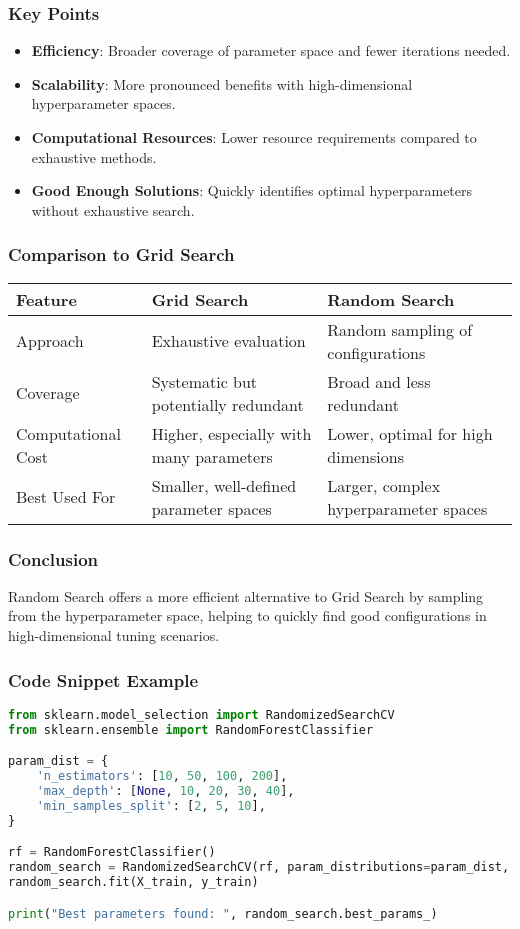 \documentclass[aspectratio=169]{beamer}
\begin{document}
\begin{frame}[fragile]
    \frametitle{Key Points}
    \begin{itemize}
        \item \textbf{Efficiency}: Broader coverage of parameter space and fewer iterations needed.
        \item \textbf{Scalability}: More pronounced benefits with high-dimensional hyperparameter spaces.
        \item \textbf{Computational Resources}: Lower resource requirements compared to exhaustive methods.
        \item \textbf{Good Enough Solutions}: Quickly identifies optimal hyperparameters without exhaustive search.
    \end{itemize}
\end{frame}

\begin{frame}[fragile]
    \frametitle{Comparison to Grid Search}
    \begin{tabular}{|l|l|l|}
        \hline
        \textbf{Feature} & \textbf{Grid Search} & \textbf{Random Search} \\ \hline
        Approach & Exhaustive evaluation & Random sampling of configurations \\ \hline
        Coverage & Systematic but potentially redundant & Broad and less redundant \\ \hline
        Computational Cost & Higher, especially with many parameters & Lower, optimal for high dimensions \\ \hline
        Best Used For & Smaller, well-defined parameter spaces & Larger, complex hyperparameter spaces \\ \hline
    \end{tabular}
\end{frame}

\begin{frame}[fragile]
    \frametitle{Conclusion}
    Random Search offers a more efficient alternative to Grid Search by sampling from the hyperparameter space, helping to quickly find good configurations in high-dimensional tuning scenarios.
\end{frame}

\begin{frame}[fragile]
    \frametitle{Code Snippet Example}
    \begin{lstlisting}[language=Python]
from sklearn.model_selection import RandomizedSearchCV
from sklearn.ensemble import RandomForestClassifier

param_dist = {
    'n_estimators': [10, 50, 100, 200],
    'max_depth': [None, 10, 20, 30, 40],
    'min_samples_split': [2, 5, 10],
}

rf = RandomForestClassifier()
random_search = RandomizedSearchCV(rf, param_distributions=param_dist, n_iter=10)
random_search.fit(X_train, y_train)

print("Best parameters found: ", random_search.best_params_)
    \end{lstlisting}
\end{frame}
\end{document}
